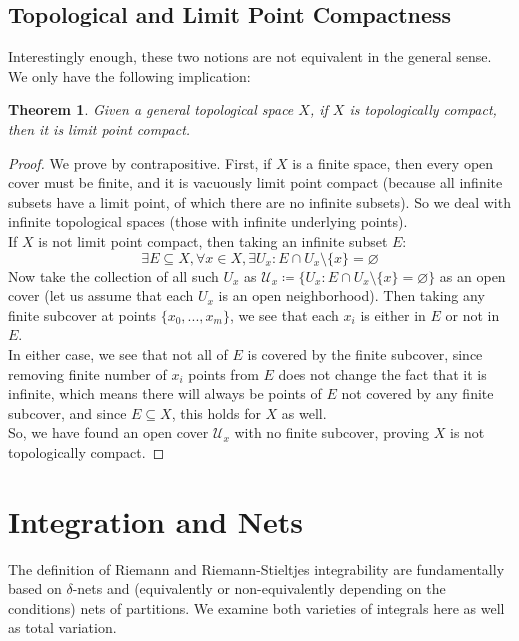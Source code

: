 \documentclass[10pt,letterpaper]{article} %
\newtheorem{thm}{Theorem}[section]
\begin{document}
\subsection{Topological and Limit Point Compactness}
Interestingly enough, these two notions are not equivalent in the general sense. We only have the following implication:
\begin{thm}
Given a general topological space $X$, if $X$ is topologically compact, then it is limit point compact.
\end{thm}
\begin{proof}
We prove by contrapositive. First, if $X$ is a finite space, then every open cover must be finite, and it is vacuously limit point compact (because all infinite subsets have a limit point, of which there are no infinite subsets). So we deal with infinite topological spaces (those with infinite underlying points).\\

If $X$ is not limit point compact, then taking an infinite subset $E$:
\begin{equation*}
\exists E \subseteq X, \forall x \in X, \exists U_x: E \cap U_x \setminus \{x\} = \varnothing
\end{equation*}
Now take the collection of all such $U_x$ as $\mathcal{U}_x \coloneq \{U_x : E \cap U_x \setminus \{x\} = \varnothing\}$ as an open cover (let us assume that each $U_x$ is an open neighborhood). Then taking any finite subcover at points $\{x_0, ..., x_m\}$, we see that each $x_i$ is either in $E$ or not in $E$.\\

In either case, we see that not all of $E$ is covered by the finite subcover, since removing finite number of $x_i$ points from $E$ does not change the fact that it is infinite, which means there will always be points of $E$ not covered by any finite subcover, and since $E \subseteq X$, this holds for $X$ as well.\\

So, we have found an open cover $\mathcal{U}_x$ with no finite subcover, proving $X$ is not topologically compact.
\end{proof}


\pagebreak

\section{Integration and Nets}
The definition of Riemann and Riemann-Stieltjes integrability are fundamentally based on $\delta$-nets and (equivalently or non-equivalently depending on the conditions) nets of partitions. We examine both varieties of integrals here as well as total variation.
\end{document}
